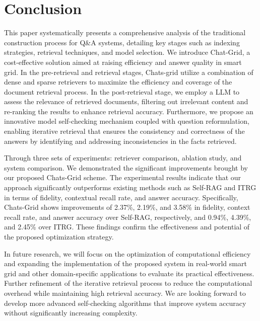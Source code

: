 


\section{Conclusion}

This paper systematically presents a comprehensive analysis of the traditional construction process for Q\&A systems, detailing key stages such as indexing strategies, retrieval techniques, and model selection. We introduce Chat-Grid, a cost-effective solution aimed at raising efficiency and answer quality in smart grid. In the pre-retrieval and retrieval stages, Chats-grid utilize a combination of dense and sparse retrievers to maximize the efficiency and coverage of the document retrieval process. In the post-retrieval stage, we employ a LLM to assess the relevance of retrieved documents, filtering out irrelevant content and re-ranking the results to enhance retrieval accuracy. Furthermore, we propose an innovative model self-checking mechanism coupled with question reformulation, enabling iterative retrieval that ensures the consistency and correctness of the answers by identifying and addressing inconsistencies in the facts retrieved.

Through three sets of experiments: retriever comparison, ablation study, and system comparison. We demonstrated the significant improvements brought by our proposed Chats-Grid scheme. The experimental results indicate that our approach significantly outperforms existing methods such as Self-RAG and ITRG in terms of fidelity, contextual recall rate, and answer accuracy. Specifically, Chats-Grid shows improvements of 2.37\%, 2.19\%, and 3.58\% in fidelity, context recall rate, and answer accuracy over Self-RAG, respectively, and 0.94\%, 4.39\%, and 2.45\% over ITRG. These findings confirm the effectiveness and potential of the proposed optimization strategy.

In future research, we will focus on the optimization of computational efficiency and expanding the implementation of the proposed system in real-world smart grid and other domain-specific applications to evaluate its practical effectiveness. Further refinement of the iterative retrieval process to reduce the computational overhead while maintaining high retrieval accuracy. We are looking forward to develop more advanced self-checking algorithms that improve system accuracy without significantly increasing complexity. 

%


